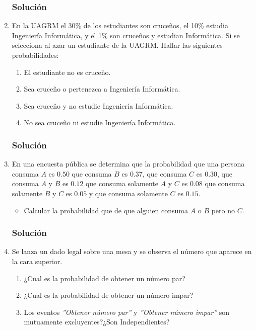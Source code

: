 \begin{enumerate}
\subsubsection{Solución}
\item En la UAGRM el 30\% de los estudiantes son cruceños, el 10\% estudia Ingeniería Informática, y el 1\% son cruceños y estudian Informática. Si se selecciona al azar un estudiante de la UAGRM. Hallar las siguientes probabilidades:
\begin{enumerate}
\item El estudiante no es cruceño.
\item Sea cruceño o pertenezca a Ingeniería Informática.
\item Sea cruceño y no estudie Ingeniería Informática.
\item No sea cruceño ni estudie Ingeniería Informática.
\end{enumerate}
\subsubsection{Solución}
\item En una encuesta pública se determina que la probabilidad que una persona consuma $A$ es $0.50$ que consuma $B$ es $0.37$, que consuma $C$ es $0.30$, que consuma $A$ y $B$ es $0.12$ que consuma solamente $A$ y $C$ es $0.08$ que consuma solamente $B$ y $C$ es $0.05$ y que consuma solamente $C$ es $0.15$.
\begin{itemize}
\item Calcular la probabilidad que de que alguien consuma $A$ o $B$ pero no $C$.
\end{itemize}
\subsubsection{Solución}
\item Se lanza un dado legal sobre una mesa y se observa el número que aparece en la cara superior.
\begin{enumerate}
\item ¿Cual es la probabilidad de obtener un número par?
\item ¿Cual es la probabilidad de obtener un número impar?
\item Los eventos \textit{''Obtener número par''} y \textit{''Obtener número impar''} son mutuamente excluyentes?¿Son Independientes?
 
\end{enumerate}

\end{enumerate}
